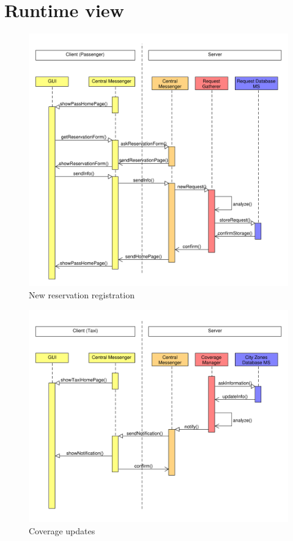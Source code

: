 \section{Runtime view}
\begin{figure}
\centering
\includegraphics[width=\textwidth]{tex-images/sequence-1}
\caption{New reservation registration}
\end{figure}

\begin{figure}
\centering
\includegraphics[width=\textwidth]{tex-images/sequence-2}
\caption{Coverage updates}
\end{figure}

